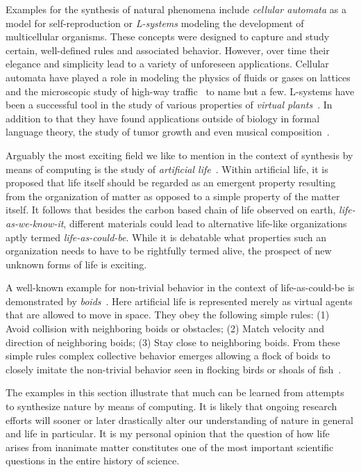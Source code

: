 		Examples for the synthesis of natural phenomena include \emph{cellular automata} as a model for self-reproduction or \emph{L-systems} modeling the development of multicellular organisms. These concepts were designed to capture and study certain, well-defined rules and associated behavior. However, over time their elegance and simplicity lead to a variety of unforeseen applications. Cellular automata have played a role in modeling the physics of fluids or gases on lattices~\cite{rothman2004lattice} and the microscopic study of high-way traffic~\cite{nagel1998two} to name but a few. L-systems have been a successful tool in the study of various properties of \emph{virtual plants}~\cite{tardieu2003virtual}. In addition to that they have found applications outside of biology in formal language theory, the study of tumor growth and even musical composition~\cite{de2005natural}.

		Arguably the most exciting field we like to mention in the context of synthesis by means of computing is the study of \emph{artificial life}~\cite{Langton:1995:ALO:526815}. Within artificial life, it is proposed that life itself should be regarded as an emergent property resulting from the organization of matter as opposed to a simple property of the matter itself. It follows that besides the carbon based chain of life observed on earth, \ie \emph{life-as-we-know-it}, different materials could lead to alternative life-like organizations aptly termed \emph{life-as-could-be}. While it is debatable what properties such an organization needs to have to be rightfully termed alive, the prospect of new unknown forms of life is exciting. 

		A well-known example for non-trivial behavior in the context of life-as-could-be is demonstrated by \emph{boids}~\cite{Reynolds:1987:FHS:37401.37406}. Here artificial life is represented merely as virtual agents that are allowed to move in space. They obey the following simple rules: (1) Avoid collision with neighboring boids or obstacles; (2) Match velocity and direction of neighboring boids; (3) Stay close to neighboring boids. From these simple rules complex collective behavior emerges allowing a flock of boids to closely imitate the non-trivial behavior seen in flocking birds or shoals of fish~\cite{de2007fundamentals}.

		The examples in this section illustrate that much can be learned from attempts to synthesize nature by means of computing. It is likely that ongoing research efforts will sooner or later drastically alter our understanding of nature in general and life in particular. It is my personal opinion that the question of how life arises from inanimate matter constitutes one of the most important scientific questions in the entire history of science.

